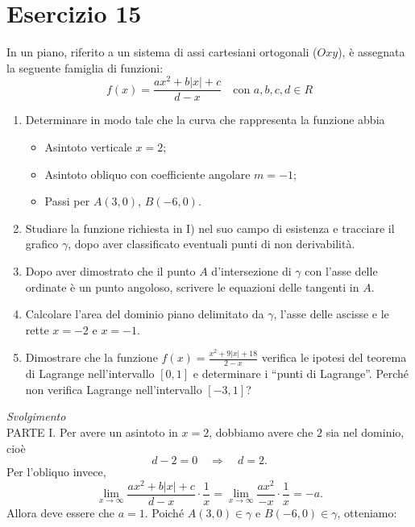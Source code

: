 \documentclass{article}
\begin{document}
\section*{Esercizio 15}
In un piano, riferito a un sistema di assi cartesiani ortogonali (\(Oxy\)), è assegnata la seguente famiglia di funzioni:
\[
f(x) = \frac{ax^2 + b|x| + c}{d - x} \quad \text{con } a, b, c, d \in R
\]

\begin{enumerate}[label=\Roman*] 
    \item Determinare in modo tale che la curva che rappresenta la funzione abbia
        \begin{itemize}
            \item Asintoto verticale $x = 2$;
            \item Asintoto obliquo con coefficiente angolare $m = -1$;
            \item Passi per $A(3, 0)$, $B(-6, 0)$.
        \end{itemize}
    
    \item Studiare la funzione richiesta in I) nel suo campo di esistenza e tracciare il grafico \(\gamma\), dopo aver classificato eventuali punti di non derivabilità.
    
    \item Dopo aver dimostrato che il punto \(A\) d’intersezione di \(\gamma\) con l’asse delle ordinate è un punto angoloso, scrivere le equazioni delle tangenti in \(A\).
    
    \item Calcolare l’area del dominio piano delimitato da \(\gamma\), l’asse delle ascisse e le rette \(x = -2\) e \(x = -1\).
    
    \item Dimostrare che la funzione \(f(x) = \frac{x^2 + 9|x| + 18}{2 - x}\) verifica le ipotesi del teorema di Lagrange nell’intervallo \([0, 1]\) e determinare i “punti di Lagrange”. Perché non verifica Lagrange nell’intervallo \([-3, 1]\)?
\end{enumerate}
\textit{Svolgimento}\\
PARTE I.
Per avere un asintoto in \(x = 2\), dobbiamo avere che \(2\) sia nel dominio, cioè
\[
d - 2 = 0 \quad \Rightarrow \quad d = 2.
\]
Per l’obliquo invece,
\[
\lim_{x \to \infty} \frac{ax^2 + b|x| + c}{d - x} \cdot \frac{1}{x} = \lim_{x \to \infty} \frac{ax^2}{-x} \cdot \frac{1}{x} = -a.
\]
Allora deve essere che \(a = 1\).
Poiché \(A(3, 0) \in \gamma\) e \(B(-6, 0) \in \gamma\), otteniamo:
\end{document}
